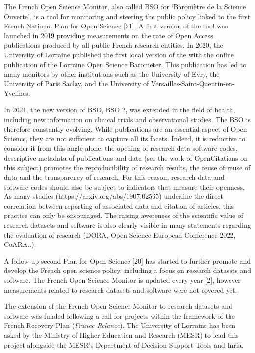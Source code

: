 \documentclass[
]{article}
\begin{document}
The French Open Science Monitor, also called BSO for `Baromètre de la
Science Ouverte', is a tool for monitoring and steering the public
policy linked to the first French National Plan for Open Science
{[}21{]}. A first version of the tool was launched in 2019 providing
measurements on the rate of Open Access publications produced by all
public French research entities. In 2020, the University of Lorraine
published the first local version of the with the online publication of
the Lorraine Open Science Barometer. This publication has led to many
monitors by other institutions such as the University of Evry, the
University of Paris Saclay, and the University of
Versailles-Saint-Quentin-en-Yvelines.

In 2021, the new version of BSO, BSO 2, was extended in the field of
health, including new information on clinical trials and observational
studies. The BSO is therefore constantly evolving. While publications
are an essential aspect of Open Science, they are not sufficient to
capture all its facets. Indeed, it is reductive to consider it from this
angle alone: the opening of research data software codes, descriptive
metadata of publications and data (see the work of OpenCitations on this
subject) promotes the reproducibility of research results, the reuse of
reuse of data and the transparency of research. For this reason,
research data and software codes should also be subject to indicators
that measure their openness. As many studies
(https://arxiv.org/abs/1907.02565) underline the direct correlation
between reporting of associated data and citation of articles, this
practice can only be encouraged. The raising awereness of the scientific
value of research datasets and software is also clearly visible in many
statements regarding the evaluation of research (DORA, Open Science
European Conference 2022, CoARA..).

A follow-up second Plan for Open Science {[}20{]} has started to further
promote and develop the French open science policy, including a focus on
research datasets and software. The French Open Science Monitor is
updated every year {[}2{]}, however measurements related to research
datasets and software were not covered yet.

The extension of the French Open Science Monitor to research datasets
and software was funded following a call for projects within the
framework of the French Recovery Plan (\emph{France Relance}). The
University of Lorraine has been asked by the Ministry of Higher
Education and Research (MESR) to lead this project alongside the MESR's
Department of Decision Support Tools and Inria.
\end{document}

